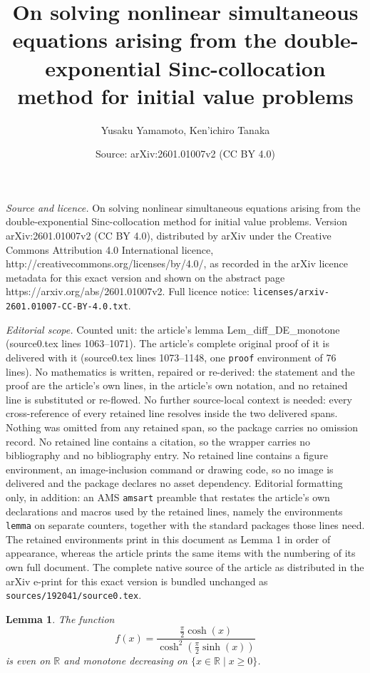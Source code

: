 \documentclass[10pt,a4paper]{amsart}
\title{On solving nonlinear simultaneous equations arising from the double-exponential Sinc-collocation method for initial value problems}
\author{Yusaku Yamamoto, Ken'ichiro Tanaka}
\date{Source: arXiv:2601.01007v2 (CC BY 4.0)}
\newtheorem{lemma}{Lemma}
\begin{document}
\maketitle

\noindent\emph{Source and licence.} On solving nonlinear simultaneous equations arising from the double-exponential Sinc-collocation method for initial value problems. Version arXiv:2601.01007v2 (CC BY 4.0), distributed by arXiv under the Creative Commons Attribution 4.0 International licence, http://creativecommons.org/licenses/by/4.0/, as recorded in the arXiv licence metadata for this exact version and shown on the abstract page https://arxiv.org/abs/2601.01007v2. Full licence notice: \texttt{licenses/arxiv-2601.01007-CC-BY-4.0.txt}.\par\smallskip

\noindent\textit{Editorial scope.} Counted unit: the article's lemma Lem\_diff\_DE\_monotone (source0.tex lines 1063--1071). The article's complete original proof of it is delivered with it (source0.tex lines 1073--1148, one \texttt{proof} environment of 76 lines). No mathematics is written, repaired or re-derived: the statement and the proof are the article's own lines, in the article's own notation, and no retained line is substituted or re-flowed.  No further source-local context is needed: every cross-reference of every retained line resolves inside the two delivered spans.  Nothing was omitted from any retained span, so the package carries no omission record.  No retained line contains a citation, so the wrapper carries no bibliography and no bibliography entry.  No retained line contains a figure environment, an image-inclusion command or drawing code, so no image is delivered and the package declares no asset dependency.  Editorial formatting only, in addition: an AMS \texttt{amsart} preamble that restates the article's own declarations and macros used by the retained lines, namely the environments \texttt{lemma} on separate counters, together with the standard packages those lines need.  The retained environments print in this document as Lemma 1 in order of appearance, whereas the article prints the same items with the numbering of its own full document.  The complete native source of the article as distributed in the arXiv e-print for this exact version is bundled unchanged as \texttt{sources/192041/source0.tex}.
\begin{lemma}
\label{Lem_diff_DE_monotone}
The function 
\[
f(x) =
\frac{\frac{\pi}{2}\cosh(x)}{\cosh^2\left(\frac{\pi}{2}\sinh(x)\right)}
\]
is even on $\mathbb{R}$ and monotone decreasing on $\{ x \in \mathbb{R} \mid  x \geq 0\}$. 
\end{lemma}
\end{document}

